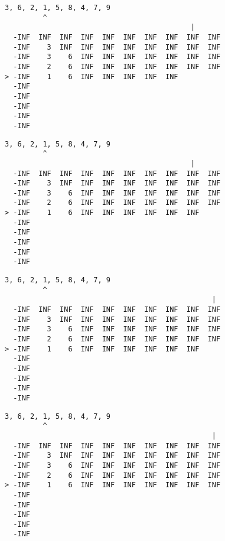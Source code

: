 { \begin{verbatim}
3, 6, 2, 1, 5, 8, 4, 7, 9
         ^
                                            |
  -INF  INF  INF  INF  INF  INF  INF  INF  INF  INF
  -INF    3  INF  INF  INF  INF  INF  INF  INF  INF
  -INF    3    6  INF  INF  INF  INF  INF  INF  INF
  -INF    2    6  INF  INF  INF  INF  INF  INF  INF
> -INF    1    6  INF  INF  INF  INF  INF          
  -INF                                             
  -INF                                             
  -INF                                             
  -INF                                             
  -INF                                             
\end{verbatim} }

{ \begin{verbatim}
3, 6, 2, 1, 5, 8, 4, 7, 9
         ^
                                            |
  -INF  INF  INF  INF  INF  INF  INF  INF  INF  INF
  -INF    3  INF  INF  INF  INF  INF  INF  INF  INF
  -INF    3    6  INF  INF  INF  INF  INF  INF  INF
  -INF    2    6  INF  INF  INF  INF  INF  INF  INF
> -INF    1    6  INF  INF  INF  INF  INF  INF     
  -INF                                             
  -INF                                             
  -INF                                             
  -INF                                             
  -INF                                             
\end{verbatim} }

{ \begin{verbatim}
3, 6, 2, 1, 5, 8, 4, 7, 9
         ^
                                                 |
  -INF  INF  INF  INF  INF  INF  INF  INF  INF  INF
  -INF    3  INF  INF  INF  INF  INF  INF  INF  INF
  -INF    3    6  INF  INF  INF  INF  INF  INF  INF
  -INF    2    6  INF  INF  INF  INF  INF  INF  INF
> -INF    1    6  INF  INF  INF  INF  INF  INF     
  -INF                                             
  -INF                                             
  -INF                                             
  -INF                                             
  -INF                                             
\end{verbatim} }

{ \begin{verbatim}
3, 6, 2, 1, 5, 8, 4, 7, 9
         ^
                                                 |
  -INF  INF  INF  INF  INF  INF  INF  INF  INF  INF
  -INF    3  INF  INF  INF  INF  INF  INF  INF  INF
  -INF    3    6  INF  INF  INF  INF  INF  INF  INF
  -INF    2    6  INF  INF  INF  INF  INF  INF  INF
> -INF    1    6  INF  INF  INF  INF  INF  INF  INF
  -INF                                             
  -INF                                             
  -INF                                             
  -INF                                             
  -INF                                             
\end{verbatim} }

